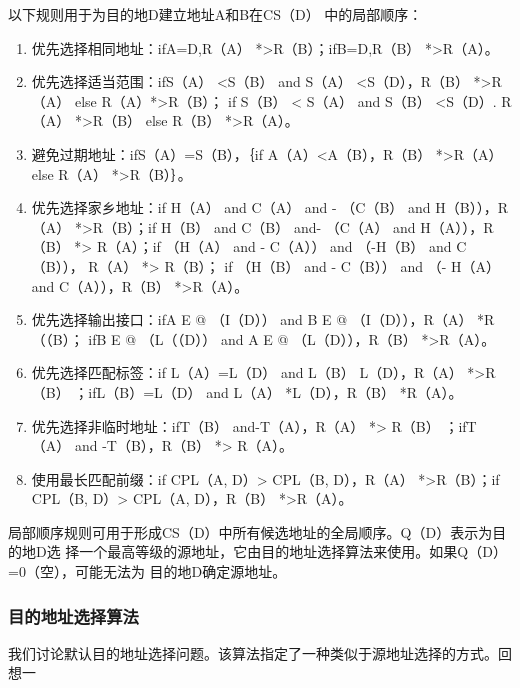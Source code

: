 以下规则用于为目的地D建立地址A和B在CS（D） 中的局部顺序：

\begin{enumerate}
    \item 优先选择相同地址：ifA=D,R（A） *>R（B）；ifB=D,R（B） *>R（A）。
    
    \item 优先选择适当范围：ifS（A） <S（B） and S（A） <S（D），R（B） *>R（A） else R（A）*>R（B）；
    if S（B） < S（A） and S（B） <S（D）. R（A） *>R（B） else R（B） *>R（A）。
    
    \item 避免过期地址：ifS（A）=S（B），｛if A（A）<A（B），R（B） *>R（A） else R（A） *>R（B）｝。
    
    \item 优先选择家乡地址：if H（A） and C（A） and - （C（B） and H（B）），R（A） *>R（B）；if H（B）
    and C（B） and- （C（A） and H（A）），R（B） *> R（A）；if （H（A） and - C（A）） and （-H（B） and C（B）），
    R（A） *> R（B）； if （H（B） and - C（B）） and （- H（A） and C（A）），R（B） *>R（A）。
    
    \item 优先选择输出接口：ifA E @ （I（D）） and B E @ （I（D）），R（A） *R（（B）； ifB E @ （L（（D））
    and A E @ （L（D）），R（B） *>R（A）。
    
    \item  优先选择匹配标签：if L（A）=L（D） and L（B） L（D），R（A） *>R（B） ；ifL（B）=L（D）
    and L（A） *L（D），R（B） *R（A）。
    
    \item 优先选择非临时地址：ifT（B） and-T（A），R（A） *> R（B） ；ifT（A） and -T（B），R（B） *>
    R（A）。
    
    \item 使用最长匹配前缀：if CPL（A, D）> CPL（B, D），R（A） *>R（B）；if CPL（B, D）>
    CPL（A, D），R（B） *>R（A）。
\end{enumerate}

局部顺序规则可用于形成CS（D）中所有候选地址的全局顺序。Q（D）表示为目的地D选
择一个最高等级的源地址，它由目的地址选择算法来使用。如果Q（D）=0（空），可能无法为
目的地D确定源地址。

\subsubsection{目的地址选择算法}
我们讨论默认目的地址选择问题。该算法指定了一种类似于源地址选择的方式。回想一


